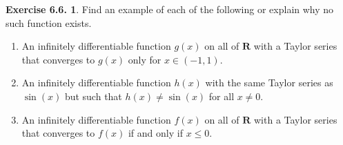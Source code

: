 \documentclass[12pt]{article}
\theoremstyle{definition}
\theoremstyle{exercise}
\newtheorem{exercise}{Exercise 6.6.}
\theoremstyle{solution}
\newcommand{\R}{\mathbf{R}}
\begin{document}
\begin{exercise}
\label{ex:7}
    Find an example of each of the following or explain why no such function exists.
    \begin{enumerate}
        \item An infinitely differentiable function \( g(x) \) on all of \( \R \) with a Taylor series that converges to \( g(x) \) only for \( x \in (-1, 1) \).

        \item An infinitely differentiable function \( h(x) \) with the same Taylor series as \( \sin(x) \) but such that \( h(x) \neq \sin(x) \) for all \( x \neq 0 \).

        \item An infinitely differentiable function \( f(x) \) on all of \( \R \) with a Taylor series that converges to \( f(x) \) if and only if \( x \leq 0 \).
    \end{enumerate}
\end{exercise}
\end{document}
